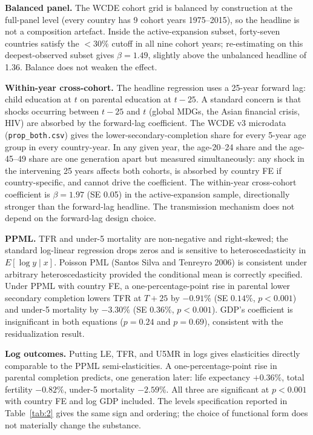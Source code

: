 \documentclass[12pt,letterpaper]{article}
\begin{document}
{\textbf{Balanced panel.} The WCDE cohort grid is balanced by
construction at the full-panel level (every country has 9 cohort years
1975--2015), so the headline is not a composition artefact. Inside the
active-expansion subset, forty-seven countries satisfy the $<30$\% cutoff
in all nine cohort years; re-estimating on this deepest-observed subset
gives $\beta=1.49$, slightly above the unbalanced headline of 1.36.
Balance does not weaken the effect.

\textbf{Within-year cross-cohort.} The headline regression uses a 25-year
forward lag: child education at $t$ on parental education at $t-25$. A
standard concern is that shocks occurring between $t-25$ and $t$
(global MDGs, the Asian financial crisis, HIV) are absorbed by the
forward-lag coefficient. The WCDE v3 microdata
(\texttt{prop\_both.csv}) gives the lower-secondary-completion share
for every 5-year age group in every country-year. In any given year,
the age-20--24 share and the age-45--49 share are one generation apart
but measured simultaneously: any shock in the intervening 25 years
affects both cohorts, is absorbed by country FE if country-specific,
and cannot drive the coefficient. The within-year cross-cohort
coefficient is $\beta=1.97$ (SE 0.05) in the active-expansion sample,
directionally stronger than the forward-lag headline. The transmission
mechanism does not depend on the forward-lag design choice.

\textbf{PPML.} TFR and under-5 mortality are non-negative and right-skewed;
the standard log-linear regression drops zeros and is sensitive to
heteroscedasticity in $E[\log y \mid x]$. Poisson PML (Santos Silva and
Tenreyro 2006) is consistent under arbitrary heteroscedasticity provided
the conditional mean is correctly specified. Under PPML with country FE,
a one-percentage-point rise in parental lower secondary completion
lowers TFR at $T+25$ by $-0.91\%$ (SE $0.14\%$, $p<0.001$) and under-5
mortality by $-3.30\%$ (SE $0.36\%$, $p<0.001$). GDP's coefficient is
insignificant in both equations ($p=0.24$ and $p=0.69$), consistent
with the residualization result.

\textbf{Log outcomes.} Putting LE, TFR, and U5MR in logs gives elasticities
directly comparable to the PPML semi-elasticities. A one-percentage-point
rise in parental completion predicts, one generation later: life expectancy
$+0.36\%$, total fertility $-0.82\%$, under-5 mortality $-2.59\%$. All
three are significant at $p<0.001$ with country FE and log GDP
included. The levels specification reported in Table~\ref{tab:2} gives the
same sign and ordering; the choice of functional form does not materially
change the substance.

}
\end{document}
